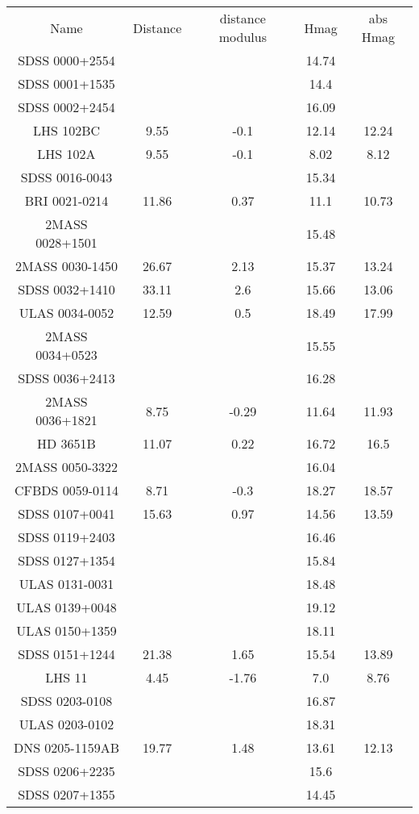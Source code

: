 \begin{table}
\begin{tabular}{ccccc}
Name & Distance & distance modulus & Hmag & abs Hmag \\
SDSS 0000+2554 &  &  & 14.74 &  \\
SDSS 0001+1535 &  &  & 14.4 &  \\
SDSS 0002+2454 &  &  & 16.09 &  \\
LHS 102BC & 9.55 & -0.1 & 12.14 & 12.24 \\
LHS 102A & 9.55 & -0.1 & 8.02 & 8.12 \\
SDSS 0016-0043 &  &  & 15.34 &  \\
BRI 0021-0214 & 11.86 & 0.37 & 11.1 & 10.73 \\
2MASS 0028+1501 &  &  & 15.48 &  \\
2MASS 0030-1450 & 26.67 & 2.13 & 15.37 & 13.24 \\
SDSS 0032+1410 & 33.11 & 2.6 & 15.66 & 13.06 \\
ULAS 0034-0052 & 12.59 & 0.5 & 18.49 & 17.99 \\
2MASS 0034+0523 &  &  & 15.55 &  \\
SDSS 0036+2413 &  &  & 16.28 &  \\
2MASS 0036+1821 & 8.75 & -0.29 & 11.64 & 11.93 \\
HD 3651B & 11.07 & 0.22 & 16.72 & 16.5 \\
2MASS 0050-3322 &  &  & 16.04 &  \\
CFBDS 0059-0114 & 8.71 & -0.3 & 18.27 & 18.57 \\
SDSS 0107+0041 & 15.63 & 0.97 & 14.56 & 13.59 \\
SDSS 0119+2403 &  &  & 16.46 &  \\
SDSS 0127+1354 &  &  & 15.84 &  \\
ULAS 0131-0031 &  &  & 18.48 &  \\
ULAS 0139+0048 &  &  & 19.12 &  \\
ULAS 0150+1359 &  &  & 18.11 &  \\
SDSS 0151+1244 & 21.38 & 1.65 & 15.54 & 13.89 \\
LHS 11 & 4.45 & -1.76 & 7.0 & 8.76 \\
SDSS 0203-0108 &  &  & 16.87 &  \\
ULAS 0203-0102 &  &  & 18.31 &  \\
DNS 0205-1159AB & 19.77 & 1.48 & 13.61 & 12.13 \\
SDSS 0206+2235 &  &  & 15.6 &  \\
SDSS 0207+1355 &  &  & 14.45 &  \\

\end{tabular}
\end{table}
